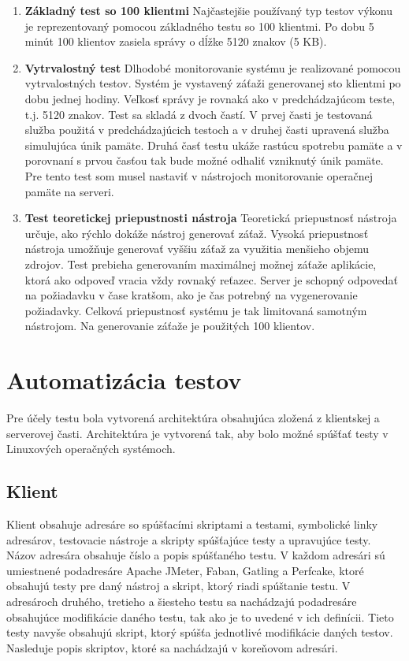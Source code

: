 \documentclass[12pt,oneside,final]{fithesis-utf8}
\begin{document}
\begin{enumerate}
\item \textbf{Základný test so 100 klientmi}
\newline
Najčastejšie používaný typ testov výkonu je reprezentovaný pomocou základného testu so 100 klientmi. Po dobu 5 minút 100 klientov zasiela správy o dĺžke 5120 znakov (5 KB).
\newline

\item \textbf{Vytrvalostný test}
\newline
Dlhodobé monitorovanie systému je realizované pomocou vytrvalostných testov. Systém je vystavený záťaži generovanej sto klientmi po dobu jednej hodiny. Veľkosť správy je rovnaká ako v predchádzajúcom teste, t.j. 5120 znakov. Test sa skladá z dvoch častí. V prvej časti je testovaná služba použitá v predchádzajúcich testoch a v druhej časti upravená služba simulujúca únik pamäte. Druhá časť testu ukáže rastúcu spotrebu pamäte a v porovnaní s prvou časťou tak bude možné odhaliť vzniknutý únik pamäte. Pre tento test som musel nastaviť v nástrojoch monitorovanie operačnej pamäte na serveri.
\newline

\item \textbf{Test teoretickej priepustnosti nástroja}
\newline
Teoretická priepustnosť nástroja určuje, ako rýchlo dokáže nástroj generovať záťaž. Vysoká priepustnosť nástroja umožňuje generovať vyššiu záťaž za využitia menšieho objemu zdrojov. Test prebieha generovaním maximálnej možnej záťaže aplikácie, ktorá ako odpoveď vracia vždy rovnaký reťazec. Server je schopný odpovedať na požiadavku v čase kratšom, ako je čas potrebný na vygenerovanie požiadavky. Celková priepustnosť systému je tak limitovaná samotným nástrojom. Na generovanie záťaže je použitých 100 klientov.

\end{enumerate}

\newpage
\section{Automatizácia testov}
Pre účely testu bola vytvorená architektúra obsahujúca zložená z klientskej a serverovej časti. Architektúra je vytvorená tak, aby bolo možné spúšťať testy v Linuxových operačných systémoch.

\subsection{Klient}
Klient obsahuje adresáre so spúšťacími skriptami a testami, symbolické linky adresárov, testovacie nástroje a skripty spúšťajúce testy a upravujúce testy. Názov adresára obsahuje číslo a popis spúšťaného testu. V každom adresári sú umiestnené podadresáre Apache JMeter, Faban, Gatling a Perfcake, ktoré obsahujú testy pre daný nástroj a skript, ktorý riadi spúštanie testu. V adresároch druhého, tretieho a šiesteho testu sa nachádzajú podadresáre obsahujúce modifikácie daného testu, tak ako je to uvedené v ich definícii. Tieto testy navyše obsahujú skript, ktorý spúšťa jednotlivé modifikácie daných testov. Nasleduje popis skriptov, ktoré sa nachádzajú v koreňovom adresári.	
\end{document}
